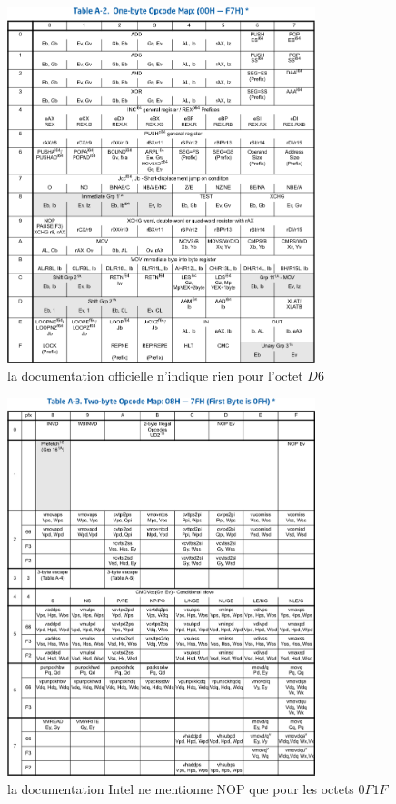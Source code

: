 \begin{itemize}
\begin{figure}[ht]
  \centering
  \includegraphics[width=0.8\textwidth]{albertini/img/undoc_setalc}
  \caption{la documentation officielle n'indique rien pour l'octet $D6$}
  \label{fig:albertini:undoc_setalc}
\end{figure}

\begin{figure}[ht]
  \centering
  \includegraphics[width=0.8\textwidth]{albertini/img/undoc_nop}
  \caption{la documentation Intel ne mentionne NOP que pour les octets $0F 1F$}
  \label{fig:albertini:undoc_nop}
\end{figure}


\end{itemize}
